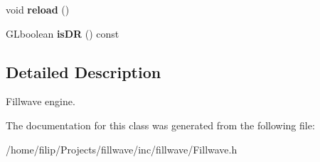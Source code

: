 \begin{DoxyCompactItemize}
\item 
\hypertarget{classfillwave_1_1Engine_ac1f51045c9dd664740800ada09656c36}{}void {\bfseries reload} ()\label{classfillwave_1_1Engine_ac1f51045c9dd664740800ada09656c36}

\item 
\hypertarget{classfillwave_1_1Engine_a9694aceb9fefec4ebdaec8428c59b5ad}{}G\+Lboolean {\bfseries is\+D\+R} () const \label{classfillwave_1_1Engine_a9694aceb9fefec4ebdaec8428c59b5ad}

\end{DoxyCompactItemize}


\subsection{Detailed Description}
Fillwave engine. 

The documentation for this class was generated from the following file\+:\begin{DoxyCompactItemize}
\item 
/home/filip/\+Projects/fillwave/inc/fillwave/Fillwave.\+h\end{DoxyCompactItemize}
